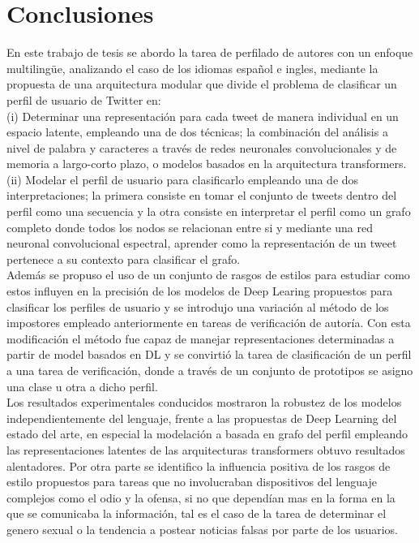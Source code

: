 \chapter*{Conclusiones}

En este trabajo de tesis se abordo la tarea de perfilado de autores con un enfoque multilingüe, analizando el caso de los idiomas español e ingles, mediante la propuesta de una arquitectura modular que divide el problema de clasificar un perfil de usuario de Twitter en:
\\ (i) Determinar una representación para cada tweet de manera individual en un espacio latente, empleando una de dos técnicas; la combinación del análisis a nivel de palabra y caracteres a través de redes neuronales convolucionales y de memoria a largo-corto plazo, o modelos basados en la arquitectura transformers. \\
(ii) Modelar el perfil de usuario para clasificarlo empleando una de dos interpretaciones; la primera consiste en tomar el conjunto de tweets dentro del perfil como una secuencia y la otra consiste en interpretar el perfil como un grafo completo donde todos los nodos se relacionan entre si y mediante una red neuronal convolucional espectral, aprender como la representación de un tweet pertenece a su contexto para clasificar el grafo.
\\
Además se propuso el uso de un conjunto de rasgos de estilos para estudiar como estos influyen en la precisión de los modelos de Deep Learing propuestos para clasificar los perfiles de usuario y se introdujo una variación al método de los impostores empleado anteriormente en tareas de verificación de autoría. Con esta modificación el método fue capaz de manejar representaciones determinadas a partir de model basados en DL y se convirtió la tarea de clasificación de un perfil a una tarea de verificación, donde a través de un conjunto de prototipos se asigno una clase u otra a dicho perfil.  
\\
Los resultados experimentales conducidos mostraron la robustez de los modelos independientemente del lenguaje, frente a las propuestas de Deep Learning del estado del arte, en especial la modelación a basada en grafo del perfil empleando las representaciones latentes de las arquitecturas transformers obtuvo resultados alentadores. Por otra parte se identifico la influencia positiva de los rasgos de estilo propuestos para tareas que no involucraban dispositivos del lenguaje complejos como el odio y la ofensa, si no que dependían mas en la forma en la que se comunicaba la información, tal es el caso de la tarea de determinar el genero sexual o la tendencia a postear noticias falsas por parte de los usuarios.
